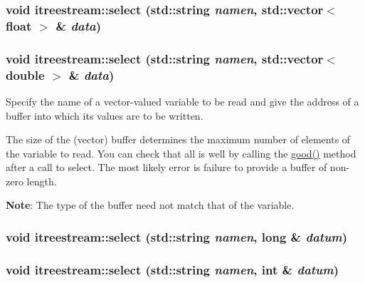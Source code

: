 \hypertarget{classitreestream_a16}{
\subsubsection[select]{\setlength{\rightskip}{0pt plus 5cm}void itreestream::select (std::string {\em namen}, std::vector$<$ float $>$ \& {\em data})}}
\label{classitreestream_a16}


\hypertarget{classitreestream_a15}{
\subsubsection[select]{\setlength{\rightskip}{0pt plus 5cm}void itreestream::select (std::string {\em namen}, std::vector$<$ double $>$ \& {\em data})}}
\label{classitreestream_a15}


Specify the name of a vector-valued variable to be read and give the address of a buffer into which its values are to be written. 

The size of the (vector) buffer determines the maximum number of elements of the variable to read. You can check that all is well by calling the \hyperlink{classitreestream_a6}{good()} method after a call to select. The most likely error is failure to provide a buffer of non-zero length. \par
 {\bf Note}: The type of the buffer need not match that of the variable. \hypertarget{classitreestream_a14}{
\subsubsection[select]{\setlength{\rightskip}{0pt plus 5cm}void itreestream::select (std::string {\em namen}, long \& {\em datum})}}
\label{classitreestream_a14}


\hypertarget{classitreestream_a13}{
\subsubsection[select]{\setlength{\rightskip}{0pt plus 5cm}void itreestream::select (std::string {\em namen}, int \& {\em datum})}}
\label{classitreestream_a13}


